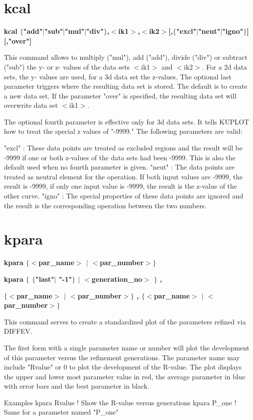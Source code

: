 \section{kcal}
{\bf kcal $ \{$"add"$| $"sub"$| $"mul"$| $"div"$\} $,$ <$ik1$> $,$ <$ik2$> $[,$ \{$"excl"$| $"neut"$| $"igno"$\} $][,"over"] \par }
\par
\vspace{3pt}
This command allows to multiply ("mul"), add ("add"), divide ("div") 
or subtract ("sub") the y- or z- values of the data sets $ <$ik1$> $ and $ <$ik2$> $. 
For a 2d data sets, the y- values are used, for a 3d data set the 
z-values.  The optional last parameter triggers where the resulting 
data set is stored. The default is to create a new data set. If the 
parameter "over" is specified, the resulting data set will overwrite 
data set $ <$ik1$> $. 
\par
The optional fourth parameter is effective only for 3d data sets. It 
tells KUPLOT how to treat the special z values of "-9999." The 
following parameters are valid: 
\par
\begin{MacVerbatim}
"excl" : These data points are treated as excluded regions and the
         result will be -9999 if one or both z-values of the data
         sets had been -9999. This is also the default used when no
         fourth parameter is given.
"neut" : The data points are treated as neutral element for the
         operation. If both input values are -9999, the result is -9999,
         if only one input value is -9999, the result is the z-value
         of the other curve.
"igno" : The special properties of these data points are ignored and
         the result is the corresponding operation between the two
         numbers.
\end{MacVerbatim}
\section{kpara}
{\bf kpara $ \{$$ <$par\_name$> $ $| $ $ <$par\_number$> $$\} $ \par }
{\bf kpara $ \{$ $ \{$"last"$| $ "-1"$\} $ $| $ $ <$generation\_no$> $ $\} $ , \par }
{\bf       $ \{$$ <$par\_name$> $ $| $ $ <$par\_number$> $$\} $ , $ \{$$ <$par\_name$> $ $| $ $ <$par\_number$> $$\} $ \par }
\par
\vspace{3pt}
This command serves to create a standardized plot of the parameters 
refined via DIFFEV. 
\par
The first form with a single parameter name or number will plot the 
development of this parameter versus the refinement generations. 
The parameter name may include "Rvalue" or 0 to plot the development 
of the R-value. 
The plot displays the upper and lower most parameter value in red, 
the average parameter in blue with error bars and the best parameter 
in black. 
\par
Examples 
kpara Rvalue    ! Show the R-value versus generations 
kpara P\_one     ! Same for a parameter named "P\_one" 

